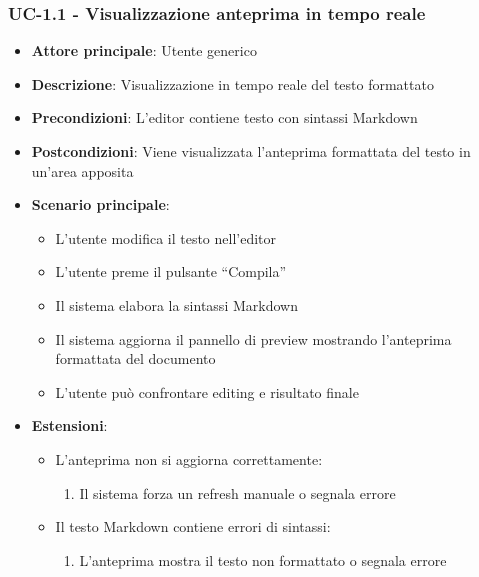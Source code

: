 \documentclass[11pt,a4paper]{article}
\begin{document}
\subsubsection{UC-1.1 - Visualizzazione anteprima in tempo reale}
\begin{itemize}
    \item \textbf{Attore principale}: Utente generico
    \item \textbf{Descrizione}: Visualizzazione in tempo reale del testo formattato
    \item \textbf{Precondizioni}: L'editor contiene testo con sintassi Markdown
    \item \textbf{Postcondizioni}: Viene visualizzata l'anteprima formattata del testo in un'area apposita
    \item \textbf{Scenario principale}:
        \begin{itemize}
            \item L'utente modifica il testo nell'editor
            \item L’utente preme il pulsante “Compila”
            \item Il sistema elabora la sintassi Markdown
            \item Il sistema aggiorna il pannello di preview mostrando l’anteprima formattata del documento
            \item L'utente può confrontare editing e risultato finale
        \end{itemize}
    \item \textbf{Estensioni}:
        \begin{itemize}
            \item L'anteprima non si aggiorna correttamente:
                \begin{enumerate}
                    \item Il sistema forza un refresh manuale o segnala errore
                \end{enumerate}
            \item Il testo Markdown contiene errori di sintassi:
                \begin{enumerate}
                    \item L'anteprima mostra il testo non formattato o segnala errore
                \end{enumerate}
        \end{itemize}
\end{itemize}
\end{document}
